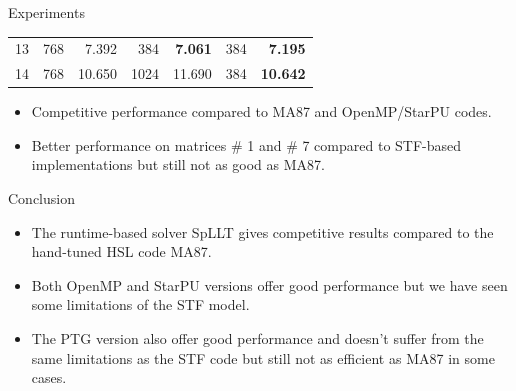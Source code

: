 \documentclass{beamer}
\newcommand{\db}[1]{\textcolor{mblue}{#1\xspace}}
\begin{document}
\begin{frame}{Experiments}
\begin{center}
{\begin{tabular}{r|rr|rr|rr}
        13 & 768                               & 7.392                      & 384  & \bf 7.061 & 384 & \bf 7.195  \\
        14 & 768                               & 10.650                     & 1024 & 11.690    & 384 & \bf 10.642 \\
        \hline
    \end{tabular}}
  \end{center}
  \begin{itemize}
  \item Competitive performance compared to MA87 and OpenMP/StarPU
    codes.
  \item Better performance on matrices \# 1 and \# 7 compared to
    STF-based implementations but still not as good as MA87.
  \end{itemize}
\end{frame}

\begin{frame}{Conclusion}
  \begin{itemize}
  \item The \alert{runtime-based} solver \db{SpLLT} gives competitive
    results compared to the \db{hand-tuned HSL code MA87}.

    \vspace{0.4cm}

  \item Both \alert{OpenMP} and \alert{StarPU} versions offer good
    performance but we have seen some limitations of the \db{STF
      model}.

    \vspace{0.4cm}

  \item The \alert{PTG} version also offer good performance and
    doesn't suffer from the same limitations as the \alert{STF} code
    but still not as efficient as MA87 in some cases.
  \end{itemize}
\end{frame}
\end{document}
